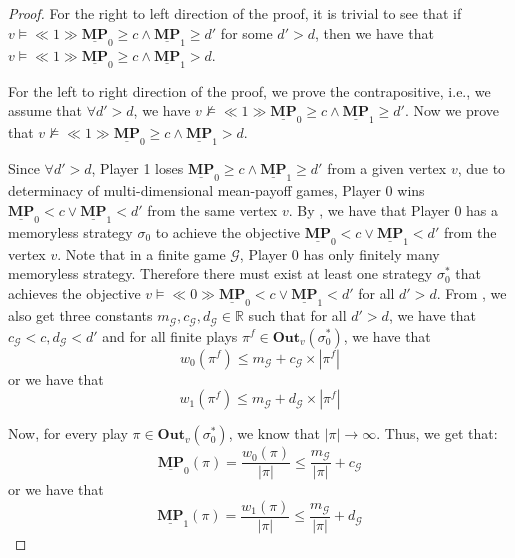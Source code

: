 \begin{proof}
    For the right to left direction of the proof, it is trivial to see that 
    if $v \models \ll 1 \gg \underline{\mathbf{MP}}_0 \geqslant c \land \underline{\mathbf{MP}}_1 \geqslant d'$ for some $d' > d$, then we have that $v \models \ll 1 \gg \underline{\mathbf{MP}}_0 \geqslant c \land \underline{\mathbf{MP}}_1 > d$.

    For the left to right direction of the proof, we prove the contrapositive, i.e., we assume that $\forall d' > d$, we have $v \nvDash \ll 1 \gg \underline{\mathbf{MP}}_0 \geqslant c \land \underline{\mathbf{MP}}_1 \geqslant d'$. Now we prove that $v \nvDash \ll 1 \gg \underline{\mathbf{MP}}_0 \geqslant c \land \underline{\mathbf{MP}}_1 > d$.

    Since $\forall d'> d$, Player 1 loses $\underline{\mathbf{MP}}_0 \geqslant c \land \underline{\mathbf{MP}}_1 \geqslant d'$ from a given vertex $v$, due to determinacy of multi-dimensional mean-payoff games, Player 0 wins $\underline{\mathbf{MP}}_0 < c \lor \underline{\mathbf{MP}}_1 < d'$ from the same vertex $v$. By \textbf{}, we have that Player 0 has a memoryless strategy $\sigma_0$ to achieve the objective $\underline{\mathbf{MP}}_0 < c \lor \underline{\mathbf{MP}}_1 < d'$ from the vertex $v$. Note that in a finite game $\mathcal{G}$, Player 0 has only finitely many memoryless strategy. Therefore there must exist at least one strategy $\sigma_0^*$ that achieves the objective $v \models \ll 0 \gg \underline{\mathbf{MP}}_0 < c \lor \underline{\mathbf{MP}}_1 < d'$ for all $d' > d$. From \textbf{}, we also get three constants $m_\mathcal{G}, c_\mathcal{G}, d_\mathcal{G} \in \mathbb{R}$ such that for all $d' > d$, we have that $c_\mathcal{G} < c, d_\mathcal{G} < d'$ and for all finite plays $\pi^f \in \mathbf{Out}_v(\sigma_0^*)$, we have that
    \begin{equation*}
        w_0(\pi^f) \leqslant m_\mathcal{G} + c_\mathcal{G} \times |\pi^f|
    \end{equation*}
    or we have that
    \begin{equation*}
        w_1(\pi^f) \leqslant m_\mathcal{G} + d_\mathcal{G} \times |\pi^f|
    \end{equation*}

    Now, for every play $\pi \in \mathbf{Out}_v(\sigma_0^*)$, we know that $|\pi| \to \infty$. Thus, we get that:
    \begin{equation*}
        \underline{\mathbf{MP}}_0(\pi) = \frac{w_0(\pi)}{|\pi|} \leqslant \frac{m_\mathcal{G}}{|\pi|} + c_\mathcal{G}
    \end{equation*}
    or we have that
    \begin{equation*}
        \underline{\mathbf{MP}}_1(\pi) = \frac{w_1(\pi)}{|\pi|} \leqslant \frac{m_\mathcal{G}}{|\pi|} + d_\mathcal{G}
    \end{equation*}


\end{proof}
